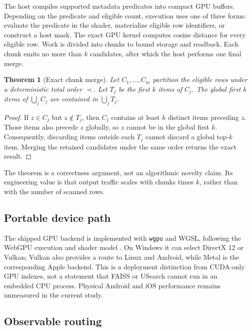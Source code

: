 \documentclass{article}
\newtheorem{theorem}{Theorem}
\newcommand{\code}[1]{\texttt{#1}}
\begin{document}
The host compiles supported metadata predicates into compact GPU buffers. Depending on the
predicate and eligible count, execution uses one of three forms: evaluate the predicate in the
shader, materialize eligible row identifiers, or construct a host mask. The exact GPU kernel
computes cosine distance for every eligible row. Work is divided into chunks to bound storage and
readback. Each chunk emits no more than $k$ candidates, after which the host performs one final
merge.

\begin{theorem}[Exact chunk merge]
Let $C_1,\ldots,C_m$ partition the eligible rows under a deterministic total order $\prec$.
Let $T_j$ be the first $k$ items of $C_j$. The global first $k$ items of
$\bigcup_j C_j$ are contained in $\bigcup_j T_j$.
\end{theorem}

\begin{proof}
If $z\in C_j$ but $z\notin T_j$, then $C_j$ contains at least $k$ distinct items preceding
$z$. Those items also precede $z$ globally, so $z$ cannot be in the global first $k$.
Consequently, discarding items outside each $T_j$ cannot discard a global top-$k$ item. Merging
the retained candidates under the same order returns the exact result.
\end{proof}

The theorem is a correctness argument, not an algorithmic novelty claim. Its engineering value is
that output traffic scales with chunks times $k$, rather than with the number of scanned rows.

\subsection{Portable device path}

The shipped GPU backend is implemented with \code{wgpu} and WGSL, following the WebGPU execution
and shader model \citep{webgpu,wgsl}. On Windows it can select DirectX 12 or Vulkan; Vulkan also
provides a route to Linux and Android, while Metal is the corresponding Apple backend. This is a
deployment distinction from CUDA-only GPU indexes, not a statement that FAISS or USearch cannot
run in an embedded CPU process. Physical Android and iOS performance remains unmeasured in the
current study.

\subsection{Observable routing}
\end{document}
